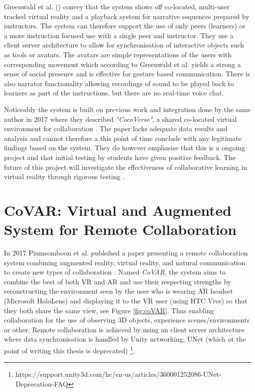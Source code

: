 Greenwald et al. (\citeyear{greenwald2019electrovr}) convey that the system shows off co-located, multi-user tracked virtual reality and a playback system for narrative sequences prepared by instructors. The system can therefore support the use of only peers (learners) or a more instruction focused use with a single peer and instructor. They use a client server architecture to allow for synchronisation of interactive objects such as tools or avatars. The avatars are simple representations of the users with corresponding movement which according to  Greenwald et al. \cite{greenwald2017investigating} yields a strong a sense of social presence and is effective for gesture based communication. There is also narrator functionality allowing recordings of sound to be played back to learners as part of the instructions, but there are no real-time voice chat.

Noticeably the system is built on previous work and integration done by the same author in 2017 where they described \textit{"CocoVerse"}, a shared co-located virtual environment for collaboration \cite{greenwald2017multi}. The paper lacks adequate data results and analysis and cannot therefore a this point of time conclude with any legitimate findings based on the system. They do however emphasise that this is a ongoing project and that initial testing by students have given positive feedback. The future of this project will investigate the effectiveness of collaborative learning in virtual reality through rigorous testing \cite{greenwald2019electrovr}.  





\section{CoVAR: Virtual and Augmented System for Remote Collaboration}
\label{sec:coVAR}
In 2017 Piumsomboon et al. publsihed a paper presenting a remote collaboration system combining augmented reality, virtual reality, and natural communication to create new types of collaboration \cite{piumsomboon2017covar}. Named \textit{CoVAR}, the system aims to combine the best of both VR and AR and use their respecting strengths by reconstructing the environment seen by the user who is wearing AR headset (Microsoft HoloLens) and displaying it to the VR user (using HTC Vive) so that they both share the same view, see Figure \ref{fig:coVAR}. Thus enabling collaboration for the use of observing 3D objects, experience scenes/environments or other. Remote collaboration is achieved by using an client server architecture where data synchronisation is handled by Unity networking, UNet (which at the point of writing this thesis is deprecated) \footnote{https://support.unity3d.com/hc/en-us/articles/360001252086-UNet-Deprecation-FAQ}.


